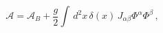 \begin{equation}\label{Adm1}
\mathcal{A}=\mathcal{A}_B+ \frac{g}{2} \int\, d^2x\, \delta(x)\,
J_{\alpha\beta}\Phi^{\alpha}\Phi^{\beta}\, ,
\end{equation}

